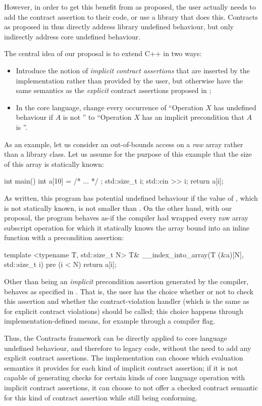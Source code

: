 However, in order to get this benefit from \cite{P2900R9} as proposed, the user actually needs to add the contract assertion  to their code, or use a library that does this. Contracts as proposed in \cite{P2900R9} thus directly address library undefined behaviour, but only indirectly address core undefined behaviour.

The central idea of our proposal is to extend C++ in two ways:
\begin{itemize}
\item Introduce the notion of \emph{implicit contract assertions} that are inserted by the implementation rather than provided by the user, but otherwise have the same semantics as the \emph{explicit} contract assertions proposed in \cite{P2900R9};
\item In the core language, change every occurrence of ``Operation $X$ has undefined behaviour if $A$ is not '' to ``Operation $X$ has an implicit precondition that $A$ is ''.
\end{itemize}
As an example, let us consider an out-of-bounds access on a \emph{raw} array rather than a library class. Let us assume for the purpose of this example that the size  of this array is statically known:
\begin{codeblock}
int main() {
  int a[10] = { /* ... */ };
  std::size_t i; std::cin >> i;
  return a[i];
}
\end{codeblock}
As written, this program has potential undefined behaviour if the value of , which is not statically known, is not smaller than . On the other hand, with our proposal, the program behaves as-if the compiler had wrapped every raw array subscript operation for which it statically knows the array bound  into an inline function with a precondition assertion:
\begin{codeblock}
template <typename T, std::size_t N>
T& __index_into_array(T (&a)[N], std::size_t i) 
pre (i < N) {
  return a[i];
}
\end{codeblock}
Other than being an \emph{implicit} precondition assertion generated by the compiler,  behaves as specified in \cite{P2900R9}. That is, the user has the choice whether or not to check this assertion and whether the contract-violation handler (which is the same as for explicit contract violations) should be called; this choice happens through implementation-defined means, for example through a compiler flag. 

Thus, the Contracts framework can be directly applied to core language undefined behaviour, and therefore to legacy code, without the need to add any explicit contract assertions. The implementation can choose which evaluation semantics it provides for each kind of implicit contract assertion; if it is not capable of generating checks for certain kinds of core language operation with implicit contract assertions, it can choose to not offer a checked contract semantic for this kind of contract assertion while still being conforming.


